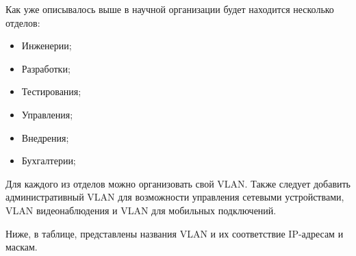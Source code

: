 Как уже описывалось выше в научной организации будет находится несколько отделов:

\begin{itemize}
    \item Инженерии;
    \item Разработки;
    \item Тестирования;
    \item Управления;
    \item Внедрения;
    \item Бухгалтерии;
\end{itemize}

Для каждого из отделов можно организовать свой VLAN. Также следует добавить административный VLAN для возможности управления сетевыми устройствами,
VLAN видеонаблюдения и VLAN для мобильных подключений.

Ниже, в таблице, представлены названия VLAN и их соответствие IP-адресам и маскам.

